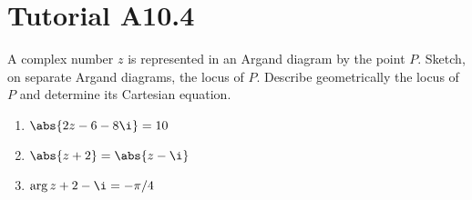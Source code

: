 \section{Tutorial A10.4}

\begin{problem}
    A complex number $z$ is represented in an Argand diagram by the point $P$. Sketch, on separate Argand diagrams, the locus of $P$. Describe geometrically the locus of $P$ and determine its Cartesian equation.

    \begin{enumerate}
        \item $\abs{2z - 6 - 8\i} = 10$
        \item $\abs{z + 2} = \abs{z - \i}$
        \item $\arg{z + 2 - \i} = -\pi/4$
    \end{enumerate}
\end{problem}
